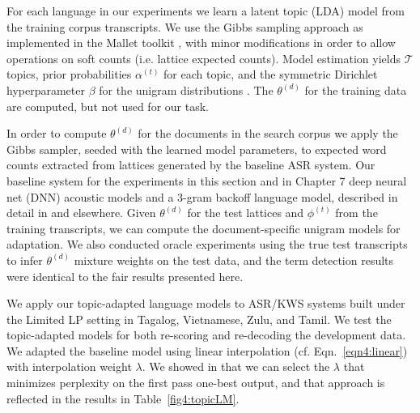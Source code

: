 %

For each language in our experiments we learn a latent topic (LDA) model from the training corpus transcripts.  We use the Gibbs sampling approach as implemented in the Mallet toolkit \cite{mallet}, with minor modifications in order to allow operations on soft counts (i.e. lattice expected counts). Model estimation yields $\mathcal{T}$ topics, prior probabilities $\alpha^{(t)}$ for each topic, and the symmetric Dirichlet hyperparameter $\beta$ for the unigram distributions \cite{steyvers2007}.  The $\theta^{(d)}$ for the training data are computed, but not used for our task. 

In order to compute $\theta^{(d)}$ for the documents in the search corpus we apply the Gibbs sampler, seeded with the learned model parameters, to expected word counts extracted from lattices generated by the baseline ASR system.  Our baseline system for the experiments in this section and in Chapter 7 deep neural net (DNN) acoustic models and a 3-gram backoff language model, described in detail in \cite{wintrode2014slta} and elsewhere.    Given $\theta^{(d)}$ for the test lattices and $\phi^{(t)}$ from the training transcripts, we can compute the document-specific unigram models for adaptation.  We also conducted oracle experiments using the true test transcripts to infer $\theta^{(d)}$ mixture weights on the test data, and the term detection results were identical to the fair results presented here.

We apply our topic-adapted language models to ASR/KWS systems built under the Limited LP setting in Tagalog, Vietnamese, Zulu, and Tamil.  We test the topic-adapted models for both re-scoring and re-decoding the development data.  We adapted the baseline model using linear interpolation (cf. Eqn.~\ref{eqn4:linear}) with interpolation weight $\lambda$. We showed in \cite{wintrode2014slta} that we can select the $\lambda$ that minimizes perplexity on the first pass one-best output, and that approach is reflected in the results in Table~\ref{fig4:topicLM}.

